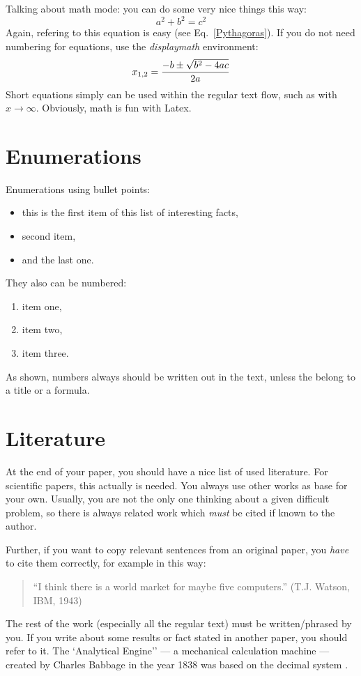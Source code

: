 \documentclass[twocolumn]{article}
\begin{document}
Talking about math mode: you can do some very nice things this way:
\begin{equation}
a^2 + b^2 = c^2
\label{Pythagoras}
\end{equation}
Again, refering to this equation is easy (see Eq.~\ref{Pythagoras}).
If you do not need numbering for equations, use the {\em displaymath}
environment:
\begin{displaymath}
x_{1,2} = \frac{-b \pm \sqrt{b^2-4ac}}{2a}\\
\end{displaymath}
Short equations simply can be used within the regular text flow, such
as with $x \to \infty$. Obviously, math is fun with Latex.


\section{Enumerations}

Enumerations using bullet points:

\begin{itemize}
	\item this is the first item of this list of interesting facts,
	\item second item,
	\item and the last one.
\end{itemize}

They also can be numbered:

\begin{enumerate}
	\item item one,
	\item item two,
	\item item three.
\end{enumerate}

As shown, numbers always should be written out in the text, unless the
belong to a title or a formula.

\section{Literature}

At the end of your paper, you should have a nice list of used
literature. For scientific papers, this actually is needed. You always
use other works as base for your own. Usually, you are not the only
one thinking about a given difficult problem, so there is always
related work which {\em must} be cited if known to the author.

Further, if you want to copy relevant sentences from an
original paper, you {\em have} to cite them correctly, for example
in this way:
\begin{quote}
	``I think there is a world market for maybe five computers.''
	(T.J. Watson, IBM, 1943)
\end{quote}
The rest of the work (especially all the regular text) must be
written/phrased by you. If you write about some results or fact
stated in another paper, you should refer to it.
The `Analytical Engine'' --- a mechanical calculation machine ---
created by Charles Babbage in the year 1838 was based on the decimal
system
\cite{Brom98}.
\end{document}
